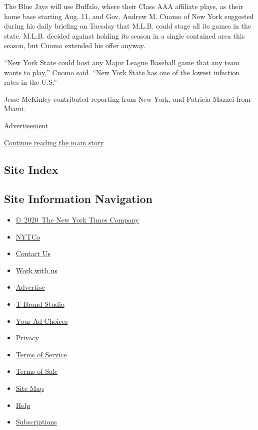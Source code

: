 The Blue Jays will use Buffalo, where their Class AAA affiliate plays,
as their home base starting Aug. 11, and Gov. Andrew M. Cuomo of New
York suggested during his daily briefing on Tuesday that M.L.B. could
stage all its games in the state. M.L.B. decided against holding its
season in a single contained area this season, but Cuomo extended his
offer anyway.

``New York State could host any Major League Baseball game that any team
wants to play,'' Cuomo said. ``New York State has one of the lowest
infection rates in the U.S.''

Jesse McKinley contributed reporting from New York, and Patricia Mazzei
from Miami.

Advertisement

\protect\hyperlink{after-bottom}{Continue reading the main story}

\hypertarget{site-index}{%
\subsection{Site Index}\label{site-index}}

\hypertarget{site-information-navigation}{%
\subsection{Site Information
Navigation}\label{site-information-navigation}}

\begin{itemize}
\tightlist
\item
  \href{https://help.nytimes.com/hc/en-us/articles/115014792127-Copyright-notice}{©~2020~The
  New York Times Company}
\end{itemize}

\begin{itemize}
\tightlist
\item
  \href{https://www.nytco.com/}{NYTCo}
\item
  \href{https://help.nytimes.com/hc/en-us/articles/115015385887-Contact-Us}{Contact
  Us}
\item
  \href{https://www.nytco.com/careers/}{Work with us}
\item
  \href{https://nytmediakit.com/}{Advertise}
\item
  \href{http://www.tbrandstudio.com/}{T Brand Studio}
\item
  \href{https://www.nytimes.com/privacy/cookie-policy\#how-do-i-manage-trackers}{Your
  Ad Choices}
\item
  \href{https://www.nytimes.com/privacy}{Privacy}
\item
  \href{https://help.nytimes.com/hc/en-us/articles/115014893428-Terms-of-service}{Terms
  of Service}
\item
  \href{https://help.nytimes.com/hc/en-us/articles/115014893968-Terms-of-sale}{Terms
  of Sale}
\item
  \href{https://spiderbites.nytimes.com}{Site Map}
\item
  \href{https://help.nytimes.com/hc/en-us}{Help}
\item
  \href{https://www.nytimes.com/subscription?campaignId=37WXW}{Subscriptions}
\end{itemize}
